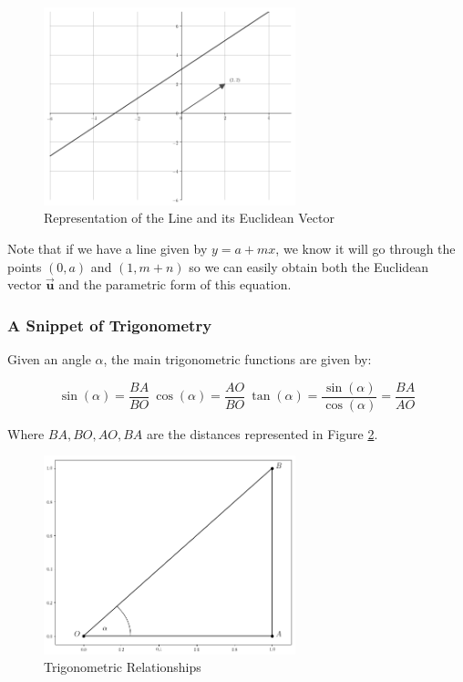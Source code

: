 \documentclass[a4paper,11pt]{article}
\theoremstyle{definition}
\theoremstyle{plain}
\begin{document}
    \begin{figure}[htbp]
    	\centering 
    		\includegraphics[width = 0.65\textwidth]{Ch1_files/Ch1_8_0.png}
    		\caption{Representation of the Line and its Euclidean Vector}
    		\label{fig:euclidean_vector}
    \end{figure}
    
Note that if we have a line given by \(y = a + m x\), we know it will go
through the points \((0,a)\) and \((1, m+n)\) so we can easily obtain
both the Euclidean vector \(\vec{\mathbf{u}}\) and the parametric form
of this equation.

\subsubsection{A Snippet of
Trigonometry}\label{a-snippet-of-trigonometry}

Given an angle \(\alpha\), the main trigonometric functions are given
by:

\[\sin(\alpha) = \frac{BA}{BO} \ \cos(\alpha) = \frac{AO}{BO} \ \tan(\alpha) = \frac{\sin(\alpha)}{\cos(\alpha)} = \frac{BA}{AO}\]

Where $BA,BO,AO,BA$ are the distances represented in Figure \ref{fig:trig_relationships}.

    \begin{figure}[htbp]
    	\centering 
    		\includegraphics[width = 0.65\textwidth]{Ch1_files/Ch1_10_0.png}
    		\caption{Trigonometric Relationships}
    		\label{fig:trig_relationships}
    \end{figure}
    
\end{document}
